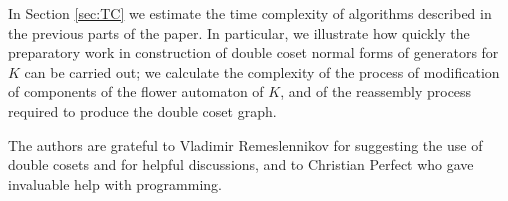 \documentclass[a4paper,12pt]{article}
\numberwithin{equation}{section}
\numberwithin{figure}{section}
\newcommand{\FF}{\ensuremath{\mathbb{F}}}
\newcommand{\la}{\langle}
\newcommand{\ra}{\rangle}
\newcommand{\be}{\begin{enumerate}}
\newcommand{\ee}{\end{enumerate}}
\begin{document}
In Section \ref{sec:TC} we estimate the time complexity of
algorithms described in the previous parts of the paper. In
particular, we illustrate how quickly the  preparatory
work in construction of  double coset normal forms of generators
for $K$  can be carried out; we calculate  the complexity of the process of modification of
components of the flower automaton of $K$, and of the reassembly process required to 
produce the double coset graph.

The authors are grateful to Vladimir Remeslennikov for suggesting the use of double cosets and 
for helpful
discussions,  and to Christian Perfect who gave invaluable help with programming.

\end{document}
